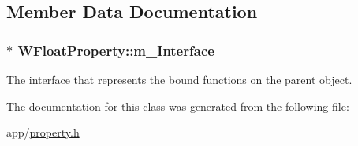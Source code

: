\subsection{Member Data Documentation}
\hypertarget{class_w_float_property_aee5767ac1ab391a1da6f396ed334e98b}{
\subsubsection[{m\-\_\-\-Interface}]{$\ast$ W\-Float\-Property\-::m\-\_\-\-Interface\hspace{0.3cm}{\ttfamily [protected]}}}\label{class_w_float_property_aee5767ac1ab391a1da6f396ed334e98b}
The interface that represents the bound functions on the parent object. 

The documentation for this class was generated from the following file\-:\begin{DoxyCompactItemize}
\item 
app/\hyperlink{property_8h}{property.\-h}\end{DoxyCompactItemize}
